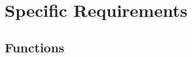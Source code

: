 \documentclass[12pt]{article} %
\begin{document}






\section{Specific Requirements}



\subsection{Functions}
\end{document}
